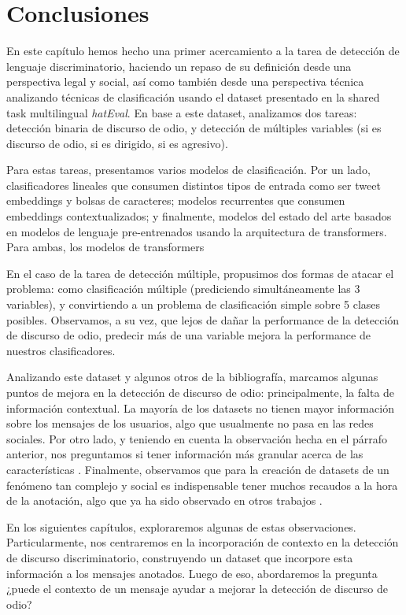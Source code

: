 \section{Conclusiones}

En este capítulo hemos hecho una primer acercamiento a la tarea de detección de lenguaje discriminatorio, haciendo un repaso de su definición desde una perspectiva legal y social, así como también desde una perspectiva técnica analizando técnicas de clasificación usando el dataset presentado en la shared task multilingual \emph{hatEval}\cite{hateval2019semeval}. En base a este dataset, analizamos dos tareas: detección binaria de discurso de odio, y detección de múltiples variables (si es discurso de odio, si es dirigido, si es agresivo).

Para estas tareas, presentamos varios modelos de clasificación. Por un lado, clasificadores lineales que consumen distintos tipos de entrada como ser tweet embeddings y bolsas de caracteres; modelos recurrentes que consumen embeddings contextualizados; y finalmente, modelos del estado del arte basados en modelos de lenguaje pre-entrenados usando la arquitectura de transformers. Para ambas, los modelos de transformers

En el caso de la tarea de detección múltiple, propusimos dos formas de atacar el problema: como clasificación múltiple (prediciendo simultáneamente las 3 variables), y convirtiendo a un problema de clasificación simple sobre 5 clases posibles. Observamos, a su vez, que lejos de dañar la performance de la detección de discurso de odio, predecir más de una variable mejora la performance de nuestros clasificadores.

Analizando este dataset y algunos otros de la bibliografía, marcamos algunas puntos de mejora en la detección de discurso de odio: principalmente, la falta de información contextual. La mayoría de los datasets no tienen mayor información sobre los mensajes de los usuarios, algo que usualmente no pasa en las redes sociales. Por otro lado, y teniendo en cuenta la observación hecha en el párrafo anterior, nos preguntamos si tener información más granular acerca de las características . Finalmente, observamos que para la creación de datasets de un fenómeno tan complejo y social es indispensable tener muchos recaudos a la hora de la anotación, algo que ya ha sido observado en otros trabajos .

En los siguientes capítulos, exploraremos algunas de estas observaciones. Particularmente, nos centraremos en la incorporación de contexto en la detección de discurso discriminatorio, construyendo un dataset que incorpore esta información a los mensajes anotados. Luego de eso, abordaremos la pregunta ¿puede el contexto de un mensaje ayudar a mejorar la detección de discurso de odio?